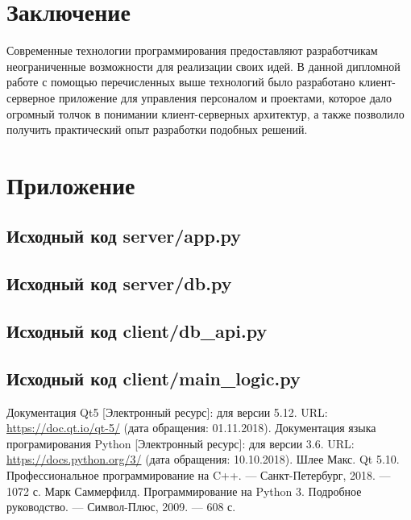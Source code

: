 \clearpage
\section{Заключение}
Современные технологии программирования предоставляют разработчикам неограниченные возможности для реализации своих идей. В данной дипломной работе с помощью перечисленных выше технологий было разработано клиент-серверное приложение для управления персоналом и проектами, которое дало огромный толчок в понимании клиент-серверных архитектур, а также позволило получить практический опыт разработки подобных решений.


\clearpage
\section{Приложение}
\subsection{Исходный код server/app.py}



\clearpage
\subsection{Исходный код server/db.py}



% 


\clearpage
\subsection{Исходный код client/db\_api.py}



\clearpage
\subsection{Исходный код client/main\_logic.py}



\clearpage
{}
\begin{thebibliography}{}
    \bibitem{}
    Документация Qt5 [Электронный ресурс]: для версии 5.12. URL: \url{https://doc.qt.io/qt-5/} (дата обращения: 01.11.2018).
    \bibitem{}
    Документация языка програмирования Python [Электронный ресурс]: для версии 3.6. URL: \url{https://docs.python.org/3/} (дата обращения: 10.10.2018).
    \bibitem{}
    Шлее Макс. Qt 5.10. Профессиональное программирование на C++. --- Санкт-Петербург, 2018. --- 1072 с.
    \bibitem{}
    Марк Саммерфилд. Программирование на Python 3. Подробное руководство. --- Символ-Плюс, 2009. --- 608 с.
\end{thebibliography}
